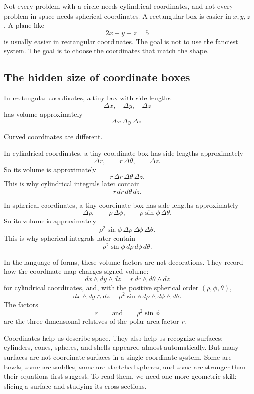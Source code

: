 Not every problem with a circle needs cylindrical coordinates, and not every problem in
space needs spherical coordinates.  A rectangular box is easier in \(x,y,z\).  A plane
like
\[
    2x-y+z=5
\]
is usually easier in rectangular coordinates.  The goal is not to use the fanciest system.
The goal is to choose the coordinates that match the shape.

\subsection{The hidden size of coordinate boxes}

In rectangular coordinates, a tiny box with side lengths
\[
    \Delta x,\quad \Delta y,\quad \Delta z
\]
has volume approximately
\[
    \Delta x\,\Delta y\,\Delta z.
\]

Curved coordinates are different.

In cylindrical coordinates, a tiny coordinate box has side lengths approximately
\[
    \Delta r,\qquad r\,\Delta\theta,\qquad \Delta z.
\]
So its volume is approximately
\[
    r\,\Delta r\,\Delta\theta\,\Delta z.
\]
This is why cylindrical integrals later contain
\[
    r\,dr\,d\theta\,dz.
\]

In spherical coordinates, a tiny coordinate box has side lengths approximately
\[
    \Delta\rho,
    \qquad
    \rho\,\Delta\phi,
    \qquad
    \rho\sin\phi\,\Delta\theta.
\]
So its volume is approximately
\[
    \rho^2\sin\phi\,\Delta\rho\,\Delta\phi\,\Delta\theta.
\]
This is why spherical integrals later contain
\[
    \rho^2\sin\phi\,d\rho\,d\phi\,d\theta.
\]

In the language of forms, these volume factors are not decorations.  They record how
the coordinate map changes signed volume:
\[
\boxed{
    dx\wedge dy\wedge dz
    =
    r\,dr\wedge d\theta\wedge dz
}
\]
for cylindrical coordinates, and, with the positive spherical order
\((\rho,\phi,\theta)\),
\[
\boxed{
    dx\wedge dy\wedge dz
    =
    \rho^2\sin\phi\,d\rho\wedge d\phi\wedge d\theta.
}
\]
The factors
\[
    r
    \qquad\text{and}\qquad
    \rho^2\sin\phi
\]
are the three-dimensional relatives of the polar area factor \(r\).

Coordinates help us describe space.  They also help us recognize surfaces: cylinders,
cones, spheres, and shells appeared almost automatically.  But many surfaces are not
coordinate surfaces in a single coordinate system.  Some are bowls, some are saddles,
some are stretched spheres, and some are stranger than their equations first suggest.
To read them, we need one more geometric skill: slicing a surface and studying its
cross-sections.

